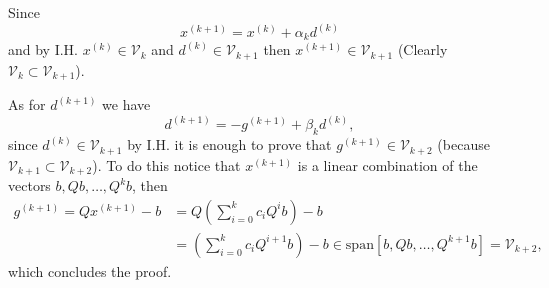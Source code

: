 \documentclass{article}
\begin{document}
Since
\[
x^{(k+1)}=x^{(k)}+\alpha_kd^{(k)}
\]
and by I.H. $x^{(k)}\in \mathcal{V}_k$ and $d^{(k)}\in\mathcal{V}_{k+1}$ then
$x^{(k+1)}\in
\mathcal{V}_{k+1}$ (Clearly $\mathcal{V}_k\subset\mathcal{V}_{k+1}$).

As for $d^{(k+1)}$ we have
\[
d^{(k+1)}=-g^{(k+1)}+\beta_k d^{(k)},
\]
since $d^{(k)}\in\mathcal{V}_{k+1}$ by I.H. it is enough to prove that
$g^{(k+1)}\in\mathcal{V}_{k+2}$ (because
$\mathcal{V}_{k+1}\subset\mathcal{V}_{k+2}$). To do this notice that
$x^{(k+1)}$ is a linear combination of the vectors $b,Qb,\dots,Q^{k}b$, then
\begin{align*}
g^{(k+1)}=Qx^{(k+1)}-b&=Q\left(\sum_{i=0}^kc_iQ^ib\right) -b\\
&=\left(\sum_{i=0}^kc_iQ^{i+1}b\right)-b \in
\text{span}[b,Qb,\dots,Q^{k+1}b]=\mathcal{V}_{k+2},
\end{align*}
which concludes the proof.
\end{document}
